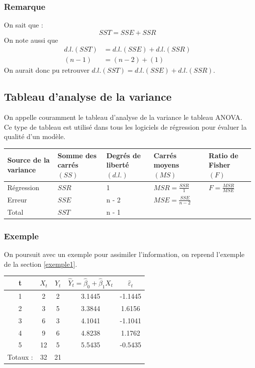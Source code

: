 \documentclass[11pt,french]{report}
\begin{document}
\subsubsection*{Remarque}
On sait que :
$$
SST = SSE + SSR
$$
On note aussi que 
\begin{align*}
d.l.(SST) &= d.l.(SSE) + d.l.(SSR) \\
(n-1) &= (n-2) + (1)
\end{align*}
On aurait donc pu retrouver $d.l.(SST) = d.l.(SSE) + d.l.(SSR)$.

\subsection{Tableau d'analyse de la variance}
\label{seq:anova}
On appelle couramment le tableau d'analyse de la variance le tableau ANOVA. Ce type de tableau est utilisé dans tous les logiciels de régression pour évaluer la qualité d'un modèle.

\bigskip
\begin{tabularx}{\linewidth}{|X|X|X|X|X|}
\hline
Source de la variance & Somme des carrés $(SS)$ & Degrés de liberté $(d.l.)$ & Carrés moyens $(MS)$ & Ratio de Fisher $(F)$ \\
\hline
Régression & $SSR$ & 1 & $MSR = \frac{SSR}{1}$ & $F = \frac{MSR}{MSE}$ \\
Erreur & $SSE$ & n - 2 & $ MSE = \frac{SSE}{n-2}$ & \\
\hline
Total & $SST$ & n - 1 & & \\
\hline
\end{tabularx}

\bigskip
\subsubsection*{Exemple}
On poursuit avec un exemple pour assimiler l'information, on reprend l'exemple de la section \ref{exemple1}.

\bigskip
\begin{center}
\begin{tabular}{|c|c|c|c|c|}
\hline
t & $X_t$ & $Y_t$  & $\hat{Y}_t = \hat{\beta}_0 + \hat{\beta}_1X_t$ & $\hat{\varepsilon}_t$\\
\hline
1 & 2 & 2 & 3.1445 & -1.1445\\
2 & 3 & 5 & 3.3844 & 1.6156\\
3 & 6 & 3 & 4.1041 & -1.1041\\
4 & 9 & 6 & 4.8238 & 1.1762\\
5 & 12 & 5 & 5.5435 & -0.5435\\
\hline
Totaux : & 32 & 21 & & \\
\hline
\end{tabular}
\end{center}
\end{document}

